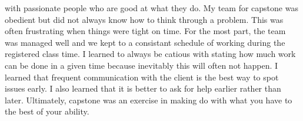 \documentclass[../final.tex]{subfiles}
\begin{document}
with passionate people who are good at what they do. My team for capstone was 
obedient but did not always know how to think through a problem. This was often 
frustrating when things were tight on time. For the most part, the team was managed 
 well and we kept to a consistant schedule of working during the registered class time.
I learned to always be catious with stating how much work can be done in a given time 
because inevitably this will often not happen. I learned that frequent communication 
with the client is the best way to spot issues early. I also learned that it is better 
to ask for help earlier rather than later. Ultimately, capstone was an exercise in 
making do with what you have to the best of your ability.  
\end{document}
